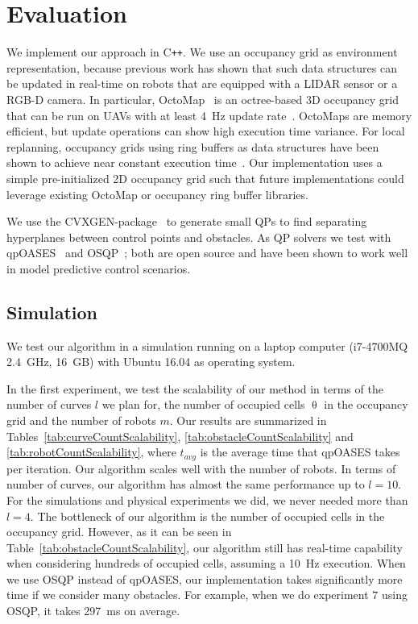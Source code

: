 \documentclass{svproc}
\begin{document}
\section{Evaluation} \label{evaluationSection}

We implement our approach in C\texttt{++}.
We use an occupancy grid as environment representation, because previous work has shown that such data structures can be updated in real-time on robots that are equipped with a LIDAR sensor or a RGB-D camera.
In particular, OctoMap~\cite{octomap} is an octree-based 3D occupancy grid that can be run on UAVs with at least \SI{4}{Hz} update rate~\cite{replanning-eth}.
OctoMaps are memory efficient, but update operations can show high execution time variance.
For local replanning, occupancy grids using ring buffers as data structures have been shown to achieve near constant execution time~\cite{replanning-usenko}.
Our implementation uses a simple pre-initialized 2D occupancy grid such that future implementations could leverage existing OctoMap or occupancy ring buffer libraries.

We use the CVXGEN-package~\cite{cvxgen} to generate small QPs to find separating hyperplanes between control points and obstacles.
As QP solvers we test with qpOASES~\cite{qpOASES} and OSQP~\cite{osqp}; both are open source and have been shown to work well in model predictive control scenarios. 


\subsection{Simulation}\label{simulationSection}
We test our algorithm in a simulation running on a laptop computer (i7-4700MQ \SI{2.4}{GHz}, \SI{16}{GB}) with Ubuntu 16.04 as operating system.

In the first experiment, we test the scalability of our method in terms of the number of curves $l$ we plan for, the number of occupied cells $\uptheta$ in the occupancy grid and the number of robots $m$.
Our results are summarized in Tables~\ref{tab:curveCountScalability}, \ref{tab:obstacleCountScalability} and \ref{tab:robotCountScalability}, where $t_{avg}$ is the average time that qpOASES takes per iteration.
Our algorithm scales well with the number of robots.
In terms of number of curves, our algorithm has almost the same performance up to $l=10$. For the simulations and physical experiments we did, we never needed more than $l=4$.
The bottleneck of our algorithm is the number of occupied cells in the occupancy grid. However, as it can be seen in Table~\ref{tab:obstacleCountScalability}, our algorithm still has real-time capability when considering hundreds of occupied cells, assuming a \SI{10}{Hz} execution.
When we use OSQP instead of qpOASES, our implementation takes significantly more time if we consider many obstacles.
For example, when we do experiment $7$ using OSQP, it takes \SI{297}{ms} on average.
\end{document}
